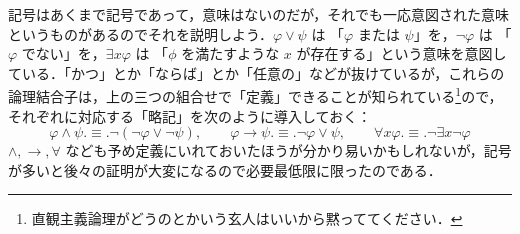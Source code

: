\documentclass[a4j,xelatex,ja=standard]{ltjsarticle}
\begin{document}
記号はあくまで記号であって，意味はないのだが，それでも一応意図された意味というものがあるのでそれを説明しよう．$\varphi \vee \psi$ は 「$\varphi$ または $\psi$」を，$\neg \varphi$ は 「$\varphi$ でない」を，$\exists x \varphi$ は 「$\phi$ を満たすような $x$ が存在する」という意味を意図している．「かつ」とか「ならば」とか「任意の」などが抜けているが，これらの論理結合子は，上の三つの組合せで「定義」できることが知られている\footnote{直観主義論理がどうのとかいう玄人はいいから黙っててください．}ので，それぞれに対応する「略記」を次のように導入しておく：
\[
 \varphi \wedge \psi \mathrel{.{\equiv}.} \neg (\neg \varphi \vee \neg \psi), \qquad \varphi \rightarrow \psi \mathrel{.{\equiv}.} \neg \varphi \vee \psi, \qquad
 \forall x \varphi \mathrel{.{\equiv}.} \neg \exists x \neg \varphi
\]
$\wedge, \rightarrow, \forall$ なども予め定義にいれておいたほうが分かり易いかもしれないが，記号が多いと後々の証明が大変になるので必要最低限に限ったのである．
\end{document}
